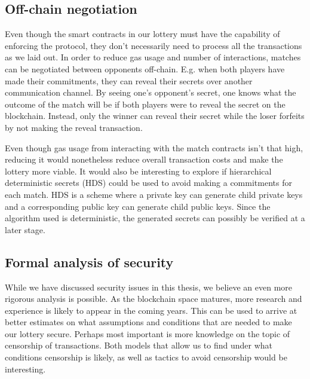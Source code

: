 \subsection{Off-chain negotiation}

Even though the smart contracts in our lottery must have the capability of enforcing the protocol, they don't necessarily need to process all the transactions as we laid out. In order to reduce gas usage and number of interactions, matches can be negotiated between opponents off-chain. E.g. when both players have made their commitments, they can reveal their secrets over another communication channel. By seeing one's opponent's secret, one knows what the outcome of the match will be if both players were to reveal the secret on the blockchain. Instead, only the winner can reveal their secret while the loser forfeits by not making the reveal transaction.

Even though gas usage from interacting with the match contracts isn't that high, reducing it would nonetheless reduce overall transaction costs and make the lottery more viable. It would also be interesting to explore if hierarchical deterministic secrets (HDS) could be used to avoid making a commitments for each match. HDS is a scheme where a private key can generate child private keys and a corresponding public key can generate child public keys. Since the algorithm used is deterministic, the generated secrets can possibly be verified at a later stage.

\subsection{Formal analysis of security}

While we have discussed security issues in this thesis, we believe an even more rigorous analysis is possible. As the blockchain space matures, more research and experience is likely to appear in the coming years. This can be used to arrive at better estimates on what assumptions and conditions that are needed to make our lottery secure. Perhaps most important is more knowledge on the topic of censorship of transactions. Both models that allow us to find under what conditions censorship is likely, as well as tactics to avoid censorship would be interesting.
